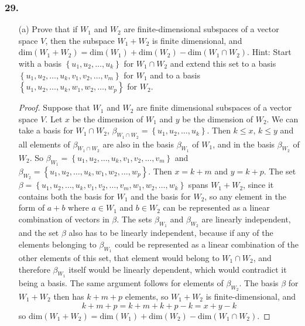 \documentclass{article}
\begin{document}
\subsubsection*{29.}
\begin{enumerate}
	\item[(a)] Prove that if $W_1$ and $W_2$ are finite-dimensional subspaces of a vector space $V$, then the subspace $W_1 + W_2$ is finite dimensional, and $\text{dim}(W_1 + W_2) = \text{dim}(W_1) + \text{dim}(W_2) - \text{dim}(W_1 \cap W_2)$. Hint: Start with a basis $\left\{u_1, u_2, \dots, u_k\right\}$ for $W_1 \cap W_2$ and extend this set to a basis $\left\{u_1, u_2, \dots, u_k, v_1, v_2, \dots, v_m\right\}$ for $W_1$ and to a basis $\left\{u_1, u_2, \dots, u_k, w_1, w_2, \dots, w_p\right\}$ for $W_2$.
	
	\begin{proof}
		Suppose that $W_1$ and $W_2$ are finite dimensional subspaces of a vector space $V$. Let $x$ be the dimension of $W_1$ and $y$ be the dimension of $W_2$. We can take a basis for $W_1 \cap W_2$, $\beta_{W_1 \cap W_2} = \left\{u_1, u_2, \dots, u_k\right\}$. Then $k \le x$, $k \le y$ and all elements of $\beta_{W_1 \cap W_2}$ are also in the basis $\beta_{W_1}$ of $W_1$, and in the basis $\beta_{W_2}$ of $W_2$. So $\beta_{W_1} = \left\{u_1, u_2, \dots, u_k, v_1, v_2, \dots, v_m\right\}$ and $\beta_{W_2} = \left\{u_1, u_2, \dots, u_k, w_1, w_2, \dots, w_p\right\}$. Then $x = k + m$ and $y = k + p$. The set $\beta = \left\{u_1, u_2, \dots, u_k, v_1, v_2, \dots, v_m, w_1, w_2, \dots, w_k\right\}$ spans $W_1 + W_2$, since it contains both the basis for $W_1$ and the basis for $W_2$, so any element in the form of $a + b$ where $a\in W_1$ and $b \in W_2$ can be represented as a linear combination of vectors in $\beta$. The sets $\beta_{W_1}$ and $\beta_{W_2}$ are linearly independent, and the set $\beta$ also has to be linearly independent, because if any of the elements belonging to $\beta_{W_1}$ could be represented as a linear combination of the other elements of this set, that element would belong to $W_1 \cap W_2$, and therefore $\beta_{W_1}$ itself would be linearly dependent, which would contradict it being a basis. The same argument follows for elements of $\beta_{W_2}$. The basis $\beta$ for $W_1 + W_2$ then has $k + m + p$ elements, so $W_1 + W_2$ is finite-dimensional, and \[k + m + p = k + m + k + p - k = x + y - k\] so $\text{dim}(W_1 + W_2) = \text{dim}(W_1) + \text{dim}(W_2) - \text{dim}(W_1 \cap W_2)$.
	\end{proof}
	

\end{enumerate}
\end{document}
